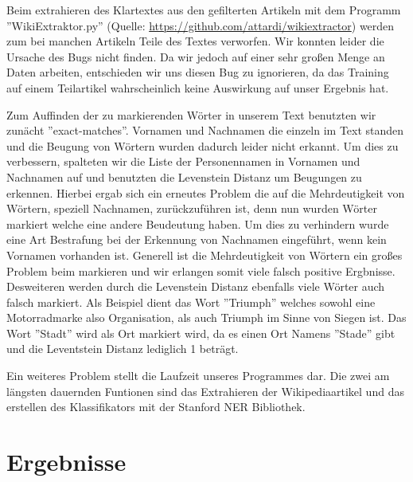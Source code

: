 \documentclass[a4paper]{article}
\begin{document}
Beim extrahieren des Klartextes aus den gefilterten Artikeln mit dem Programm ''WikiExtraktor.py'' (Quelle: \url{https://github.com/attardi/wikiextractor}) werden zum bei manchen Artikeln Teile des Textes verworfen. Wir konnten leider die Ursache des Bugs nicht finden. Da wir jedoch auf einer sehr großen Menge an Daten arbeiten, entschieden wir uns diesen Bug zu ignorieren, da das Training auf einem Teilartikel wahrscheinlich keine Auswirkung auf unser Ergebnis hat.

Zum Auffinden der zu markierenden Wörter in unserem Text benutzten wir zunächt ''exact-matches''. Vornamen und Nachnamen die einzeln im Text standen und die Beugung von Wörtern wurden dadurch leider nicht erkannt. Um dies zu verbessern, spalteten wir die Liste der Personennamen in Vornamen und Nachnamen auf und benutzten die Levenstein Distanz um Beugungen zu erkennen. Hierbei ergab sich ein erneutes Problem die auf die Mehrdeutigkeit von Wörtern, speziell Nachnamen, zurückzuführen ist, denn nun wurden Wörter markiert welche eine andere Beudeutung haben. Um dies zu verhindern wurde eine Art Bestrafung bei der Erkennung von Nachnamen eingeführt, wenn kein Vornamen vorhanden ist. Generell ist die Mehrdeutigkeit von Wörtern ein großes Problem beim markieren und wir erlangen somit viele falsch positive Ergbnisse. Desweiteren werden durch die Levenstein Distanz ebenfalls viele Wörter auch falsch markiert. Als Beispiel dient das Wort ''Triumph'' welches sowohl eine Motorradmarke also Organisation, als auch Triumph im Sinne von Siegen ist. Das Wort ''Stadt'' wird als Ort markiert wird, da es einen Ort Namens ''Stade'' gibt und die Leventstein Distanz lediglich 1 beträgt.

Ein weiteres Problem stellt die Laufzeit unseres Programmes dar. Die zwei am längsten dauernden Funtionen sind das Extrahieren der Wikipediaartikel und das erstellen des Klassifikators mit der Stanford NER Bibliothek.
\section{Ergebnisse}
\end{document}
